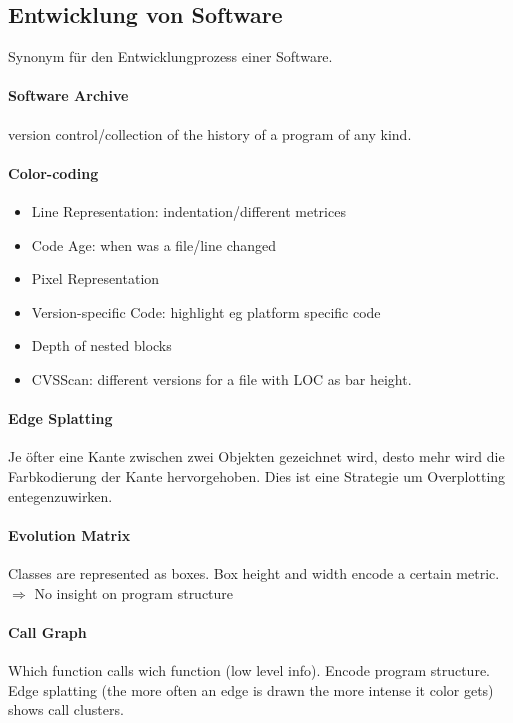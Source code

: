 \documentclass[ngerman]{scrartcl}
\begin{document}
\subsection{Entwicklung von Software}
Synonym für den Entwicklungprozess einer Software.

\paragraph{Software Archive} version control/collection of the history of a program of any kind. 

\paragraph{Color-coding}
\begin{itemize}
  \item Line Representation: indentation/different metrices
  \item Code Age: when was a file/line changed
  \item Pixel Representation
  \item Version-specific Code: highlight eg platform specific code
  \item Depth of nested blocks
  \item CVSScan: different versions for a file with LOC as bar height.
\end{itemize}

\paragraph{Edge Splatting} Je öfter eine Kante zwischen zwei Objekten gezeichnet wird, desto mehr wird die Farbkodierung der Kante hervorgehoben. Dies ist eine Strategie um Overplotting entegenzuwirken.

\paragraph{Evolution Matrix} Classes are represented as boxes. Box height and width encode a certain metric. $ \Rightarrow $ No insight on program structure

\paragraph{Call Graph} Which function calls wich function (low level info). Encode program structure. Edge splatting (the more often an edge is drawn the more intense it color gets) shows call clusters.
\end{document}
